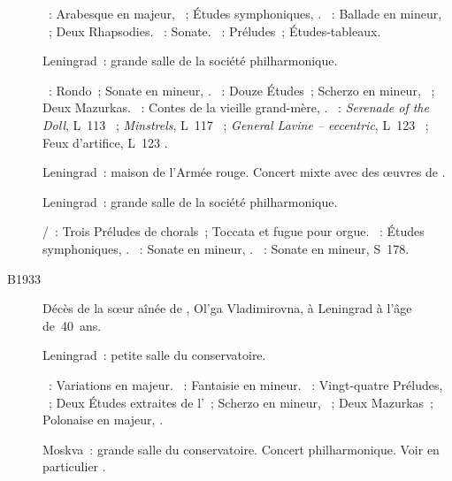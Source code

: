 \begin{description}
 \textsc{\Schumann{}}~: Arabesque en \kC majeur, ~; Études
 symphoniques, .
 \textsc{\Brahms{}}~: Ballade en \kG mineur,  ~; Deux
 Rhapsodies.
 \textsc{\Chopin{}}~: Sonate.
 \textsc{\Rachmaninov{}}~: Préludes~; Études-tableaux.
 \item[\DateWithWeekDay{1933-10-23}]
 Leningrad~: grande salle de la société philharmonique.

 \textsc{\Beethoven{}}~: Rondo~; Sonate en \kC mineur, .
 \textsc{\Chopin{}}~: Douze Études~; Scherzo en \kB \Flat mineur,
 ~; Deux Mazurkas.
 \textsc{\Prokofiev{}}~: Contes de la vieille grand-mère, .
 \textsc{\Debussy{}}~: \emph{Serenade of the Doll}, L~113 ~;
 \emph{Minstrels}, L~117 ~; \emph{General Lavine -- eccentric},
 L~123 ~; Feux d'artifice, L~123 .
 \item[\DateWithWeekDay{1933-11-09}]
 Leningrad~: maison de l'\hbox{Armée} rouge.
 Concert mixte avec des œuvres de \Chopin{}.
 \item[\DateWithWeekDay{1933-12-11}]
 Leningrad~: grande salle de la société philharmonique.

 \textsc{\JBach{}/\Busoni{}}~: Trois Préludes de chorals~; Toccata et fugue
 pour orgue.
 \textsc{\Schumann{}}~: Études symphoniques, .
 \textsc{\Beethoven{}}~: Sonate en \kC \Sharp mineur,  .
 \textsc{\Liszt{}}~: Sonate en \kB mineur, S~178.
 \item[B1933]
 Décès de la sœur aînée de \VSofronitsky{}, Ol'ga Vladimirovna, à Leningrad
 à l'âge de~40~ans.
 \item[\DateWithWeekDay{1933-12-23}]
 Leningrad~: petite salle du conservatoire.

 \textsc{\Haendel{}}~: Variations en \kE majeur.
 \textsc{\Mozart{}}~: Fantaisie en \kC mineur.
 \textsc{\Chopin{}}~: Vingt-quatre Préludes, ~; Deux Études
 extraites de l'~; Scherzo en \kC \Sharp mineur, ~; Deux
 Mazurkas~; Polonaise en \kA \Flat majeur, .
 \item[\DateWithWeekDay{1933-12-25}]
 Moskva~: grande salle du conservatoire.
 Concert philharmonique.
 Voir en particulier \citet[p.~427]{Milshteyn82a}.


\end{description}
